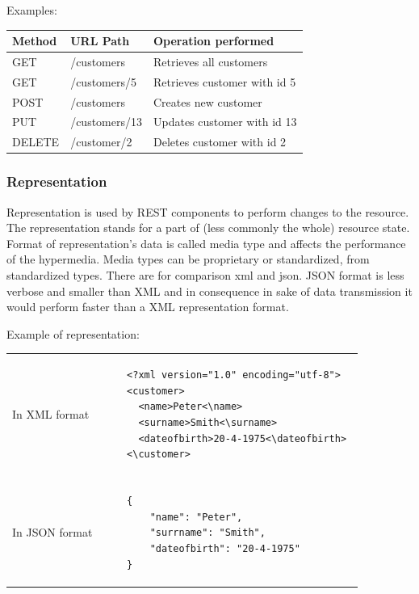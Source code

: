 Examples: \\
\begin{center}
\begin{tabular}{l l l}
Method & URL Path & Operation performed \\ \hline
GET & /customers & Retrieves all customers \\
GET & /customers/5 & Retrieves customer with id 5 \\
POST & /customers & Creates new customer \\
PUT & /customers/13 & Updates customer with id 13 \\
DELETE & /customer/2 & Deletes customer with id 2 \\
\end{tabular}
\end{center}

\subsubsection{Representation}
  Representation is used by REST components to perform changes to the resource. The representation stands for a part of (less commonly the whole) resource state. Format of representation's data is called media type and affects the performance of the \gls{hypermedia}. Media types can be proprietary or standardized, from standardized types. There are for comparison \gls{xml} and \gls{json}. JSON format is less verbose and smaller than XML and in consequence in sake of data transmission it would perform faster than a XML representation format.
  
Example of representation:
\begin{center}
  \begin{tabular}[b]{l l}
    In XML format & \begin{lstlisting}
    <?xml version="1.0" encoding="utf-8">
    <customer> 
      <name>Peter<\name> 
      <surname>Smith<\surname> 
      <dateofbirth>20-4-1975<\dateofbirth> 
    <\customer>
    \end{lstlisting} \\
    
\\
    
    In JSON format & \begin{lstlisting}
    {
        "name": "Peter", 
        "surrname": "Smith", 
        "dateofbirth": "20-4-1975"
    }
    \end{lstlisting}
  \end{tabular}
\end{center}

